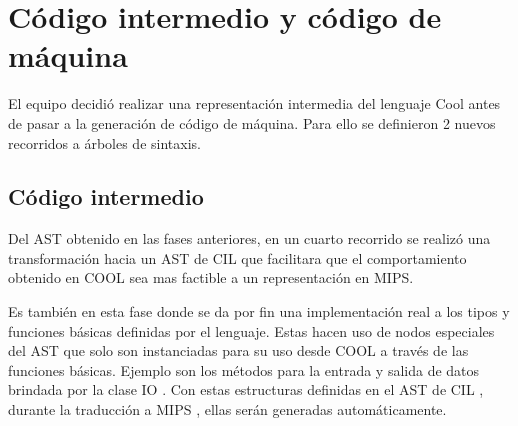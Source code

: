\documentclass[a4paper,10pt,twocolumn]{article}
\begin{document}
\section{Código intermedio y código de máquina}

El equipo decidió realizar una representación intermedia del lenguaje Cool antes de pasar a la generación de código de máquina. Para ello se definieron 2 nuevos recorridos a árboles de sintaxis.

\subsection{Código intermedio}
	
 Del AST obtenido en las fases anteriores, en un cuarto recorrido se realizó una transformación hacia un AST de  CIL  que facilitara que el comportamiento obtenido en  COOL  sea mas factible a un representación en MIPS.


 Es también en esta fase donde se da por fin una implementación real a los tipos y
 funciones básicas definidas por el lenguaje. Estas hacen uso de nodos especiales
 del AST que solo son instanciadas para su uso desde  COOL a través de las funciones
 básicas. Ejemplo son los métodos para la entrada y salida de datos brindada por la
 clase  IO . Con estas estructuras definidas en el AST de  CIL , durante la traducción a
 MIPS , ellas serán generadas automáticamente.
 
\end{document}
